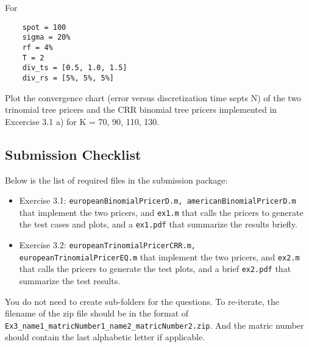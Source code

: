 \documentclass[12pt,a4paper,hidelinks,fleqn]{article}            %
\begin{document}
For 
\vspace{-1cm} 
\begin{verbatim}
    spot = 100
    sigma = 20%
    rf = 4%
    T = 2
    div_ts = [0.5, 1.0, 1.5]
    div_rs = [5%, 5%, 5%]
\end{verbatim} 

Plot the convergence chart (error versus discretization time septs N) of the two trinomial tree pricers and the CRR binomial tree pricers implemented in Excercise 3.1 a) for K = 70, 90, 110, 130.

\subsection*{Submission Checklist}
Below is the list of required files in the submission package:
\begin{itemize}
\item Exercise 3.1: \verb=europeanBinomialPricerD.m, americanBinomialPricerD.m= that implement the two pricers, and \verb=ex1.m= that calls the pricers to generate the test cases and plots, and a \verb=ex1.pdf= that summarize the results briefly.
\item Exercise 3.2: \verb=europeanTrinomialPricerCRR.m, europeanTrinomialPricerEQ.m= that implement the two pricers, and \verb=ex2.m= that calls the pricers to generate the test plots, and a brief \verb=ex2.pdf= that summarize the test results.
\end{itemize}
You do not need to create sub-folders for the questions. 
To re-iterate, the filename of the zip file should be in the format of \verb=Ex3_name1_matricNumber1_name2_matricNumber2.zip=.
And the matric number should contain the last alphabetic letter if applicable. 
\end{document}
